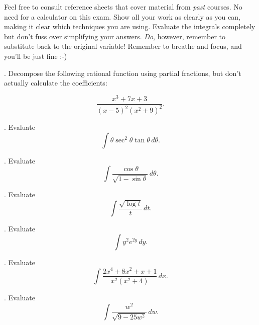 \documentclass[12pt, letterpaper]{article}
\begin{document}
\noindent Feel free to consult reference sheets that cover material from \emph{past} courses. No need for a calculator on this exam. Show all your work as clearly as you can, making it clear which techniques you are using. Evaluate the integrals completely but don't fuss over simplifying your answers. \emph{Do}, however, remember to substitute back to the original variable! Remember to breathe and focus, and you'll be just fine :-)

\vspace*{0.3in}
. Decompose the following rational function using partial fractions, but don't actually calculate the coefficients:

$$\frac{x^3 + 7x + 3}{(x-5)^2(x^2 + 9)^2}.$$


\vspace*{0.3in}
. Evaluate $$ \int \theta \sec^2{\theta} \tan{\theta} \, d\theta. $$



\vspace*{0.3in}
. Evaluate $$ \int \frac{\cos{\theta}}{\sqrt{1 - \sin{\theta}}} \, d\theta. $$



\vspace*{0.3in}
. Evaluate $$ \int \frac{\sqrt{\log{t}}}{t} \, dt. $$



\vspace*{0.3in}
. Evaluate $$ \int y^2 e^{2y} \, dy. $$



\vspace*{0.3in}
. Evaluate $$ \int \frac{2x^4 + 8x^2 + x + 1}{x^2 (x^2 + 4)} \, dx. $$



\vspace*{0.3in}
. Evaluate $$ \int \frac{w^2}{\sqrt{9 - 25 w^2}} \, dw. $$
\end{document}
